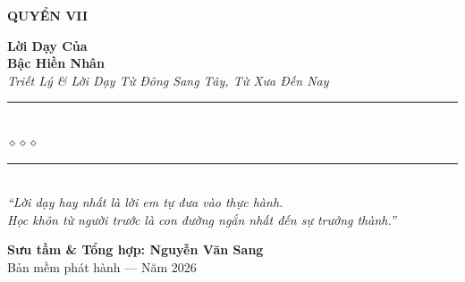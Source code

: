 \begin{titlepage}
\begin{center}
  \begin{tcolorbox}[
    width=6.5cm,
    colback=truyengold!20,
    colframe=truyengold!80!black,
    arc=4pt,
    boxrule=1.5pt,
    halign=center
  ]
    {\fontsize{18}{22}\selectfont\bfseries\color{truyenred!80!black}
     QUYỂN VII}
  \end{tcolorbox}
  \vspace{0.8cm}

  {\fontsize{38}{45}\selectfont\bfseries\color{truyenred!80!black}
    Lời Dạy Của}\\[0.4cm]
  {\fontsize{38}{45}\selectfont\bfseries\color{truyengold!80!black}
    Bậc Hiền Nhân}\\[0.4cm]

  {\fontsize{16}{20}\selectfont\color{truyengold!90!black}\itshape
    Triết Lý \& Lời Dạy Từ Đông Sang Tây, Từ Xưa Đến Nay}\\[1cm]

  {\color{truyenblue!60}\rule{6cm}{1pt}}\\[5pt]
  {\color{truyengold!80!black}\large$\diamond$\hspace{1cm}$\diamond$\hspace{1cm}$\diamond$}\\[5pt]
  {\color{truyenblue!60}\rule{6cm}{1pt}}\\[1.5cm]

  {\normalsize\itshape\color{truyenblue!90!black}
   ``Lời dạy hay nhất là lời em tự đưa vào thực hành.\\
   Học khôn từ người trước là con đường ngắn nhất đến sự trưởng thành.''}

  \vfill

  {\fontsize{16}{20}\selectfont\bfseries\color{truyenblue!90!black}
    Sưu tầm \& Tổng hợp: \textbf{Nguyễn Văn Sang}}\\[0.4cm]

  {\small\color{gray} Bản mềm phát hành --- Năm 2026}\\[0.5cm]
\end{center}

\afterpage{\nopagecolor}
\end{titlepage}